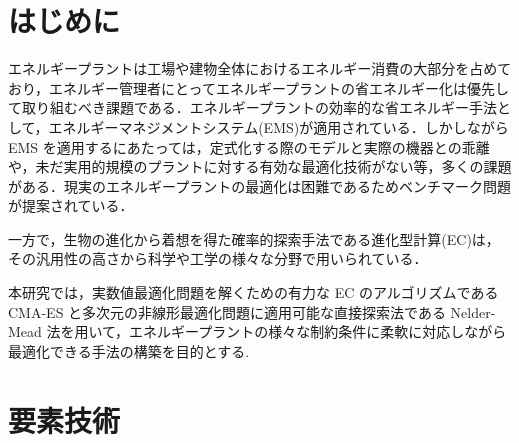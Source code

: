 \documentclass[twocolumn]{jarticle}
\begin{document}

\section{はじめに}
エネルギープラントは工場や建物全体におけるエネルギー消費の大部分を占めており，エネルギー管理者にとってエネルギープラントの省エネルギー化は優先して取り組むべき課題である．エネルギープラントの効率的な省エネルギー手法として，エネルギーマネジメントシステム(EMS)が適用されている．しかしながら EMS を適用するにあたっては，定式化する際のモデルと実際の機器との乖離や，未だ実用的規模のプラントに対する有効な最適化技術がない等，多くの課題がある．現実のエネルギープラントの最適化は困難であるためベンチマーク問題が提案されている．

一方で，生物の進化から着想を得た確率的探索手法である進化型計算(EC)は，その汎用性の高さから科学や工学の様々な分野で用いられている．

本研究では，実数値最適化問題を解くための有力な EC のアルゴリズムである CMA-ES と多次元の非線形最適化問題に適用可能な直接探索法である Nelder-Mead 法を用いて，エネルギープラントの様々な制約条件に柔軟に対応しながら最適化できる手法の構築を目的とする.


\section{要素技術}
\end{document}
